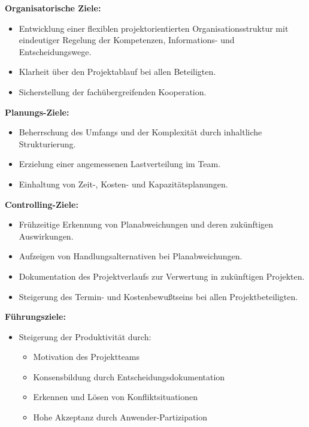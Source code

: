 \documentclass[11pt,a4paper]{article}
\begin{document}
\textbf{Organisatorische Ziele:}
\begin{itemize}
\item Entwicklung einer flexiblen projektorientierten Organisationsstruktur
mit eindeutiger Regelung der Kompetenzen, Informations- und Entscheidungswege.
\item Klarheit über den Projektablauf bei allen Beteiligten.
\item Sicherstellung der fachübergreifenden Kooperation.
\end{itemize}
\noindent
\textbf{Planungs-Ziele:}
\begin{itemize}
\item Beherrschung des Umfangs und der Komplexität durch inhaltliche Strukturierung.
\item Erzielung einer angemessenen Lastverteilung im Team.
\item Einhaltung von Zeit-, Kosten- und Kapazitätsplanungen.
\end{itemize}
\noindent
\textbf{Controlling-Ziele:}
\begin{itemize}

\item Frühzeitige Erkennung von Planabweichungen und deren zukünftigen Auswirkungen.
\item Aufzeigen von Handlungsalternativen bei Planabweichungen.

\item Dokumentation des Projektverlaufs zur Verwertung in zukünftigen Projekten.
\item Steigerung des Termin- und Kostenbewußtseins bei allen Projektbeteiligten.

\end{itemize}
\noindent
\textbf{Führungsziele:}
\begin{itemize}
\item Steigerung der Produktivität durch:
\begin{itemize}
\item Motivation des Projektteams
\item Konsensbildung durch Entscheidungsdokumentation
\item Erkennen und Lösen von Konfliktsituationen
\item Hohe Akzeptanz durch Anwender-Partizipation
\end{itemize}
\end{itemize}
\end{document}
